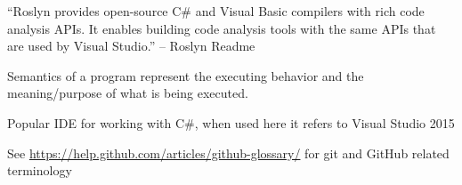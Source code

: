 \documentclass[draftclsnofoot,onecolumn]{IEEEtran}
\begin{document}
\begin{description}
\item[Roslyn:] “Roslyn provides open-source C\# and Visual Basic compilers 
with rich code analysis APIs. It enables building code analysis tools with 
the same APIs that are used by Visual Studio.” – Roslyn Readme 

\item[Semantics:] Semantics of a program represent the executing behavior and 
the meaning/purpose of what is being executed. 

\item[VS:] Popular IDE for working with C\#, when used here it refers to 
Visual Studio 2015

\end{description}

See \url{https://help.github.com/articles/github-glossary/} for git and 
GitHub related terminology
\end{document}
